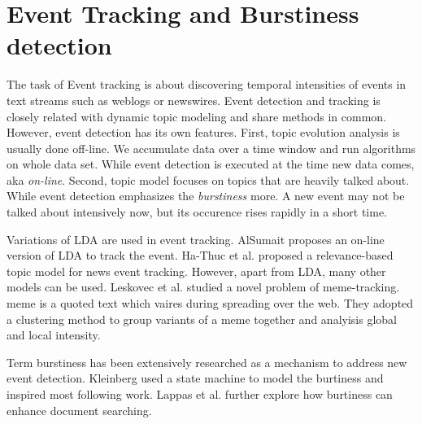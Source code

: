 \documentclass{article}
\begin{document}
\section {Event Tracking and Burstiness detection}
The task of Event tracking is about discovering temporal intensities of events in text streams such as weblogs or newswires. Event detection and tracking is closely related with dynamic topic modeling and share methods in common. However, event detection has its own features. First, topic evolution analysis is usually done off-line. We accumulate data over a time window and run algorithms on whole data set. While event detection is executed at the time new data comes, aka {\em on-line}. Second, topic model focuses on topics that are heavily talked about. While event detection emphasizes the {\em burstiness} more. A new event may not be talked about intensively now, but its occurence rises rapidly in a short time. 

Variations of LDA are used in event tracking. AlSumait\cite{alsumait2008line} proposes an on-line version of LDA to track the event. Ha-Thuc et al. proposed a relevance-based topic model for news event tracking\cite{ha2009relevance}.   
However, apart from LDA, many other models can be used. Leskovec et al. \cite{leskovec2009meme} studied a novel problem of meme-tracking. meme is a quoted text which vaires during spreading over the web. They adopted a clustering method to group variants of a meme together and analyisis global and local intensity.

Term burstiness has been extensively researched as a mechanism to address new event detection. Kleinberg \cite{kleinberg2003bursty} used a state machine to model the burtiness and inspired most following work. Lappas et al. \cite{lappas2009burstiness} further explore how burtiness can enhance document searching.


 

\end{document}
